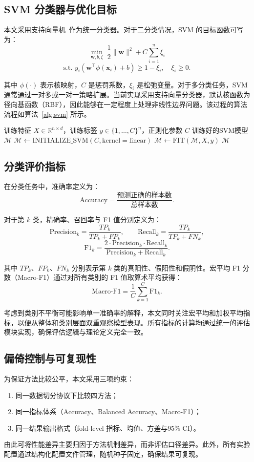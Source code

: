 \subsection{SVM 分类器与优化目标}

本文采用支持向量机~\cite{svm1995}作为统一分类器。对于二分类情况，SVM 的目标函数可写为：
\[
\min_{\mathbf{w}, b, \xi} \; \frac{1}{2}\|\mathbf{w}\|^2 + C \sum_{i=1}^{n} \xi_i
\]
\[
\text{s.t. } y_i (\mathbf{w}^\top \phi(\mathbf{x}_i) + b) \ge 1 - \xi_i, \quad \xi_i \ge 0.
\]

其中 $\phi(\cdot)$ 表示核映射，$C$ 是惩罚系数，$\xi_i$ 是松弛变量。对于多分类任务，SVM 通常通过一对多或一对一策略扩展。当前实现采用支持向量分类器，默认核函数为径向基函数（RBF），因此能够在一定程度上处理非线性边界问题。该过程的算法流程如算法~\ref{alg:svm} 所示。

\begin{algorithm}[H]
\caption{SVM分类器训练算法}
\label{alg:svm}
\begin{algorithmic}[1]
\Require 训练特征 $X \in \mathbb{R}^{n \times d}$，训练标签 $y \in \{1,\dots,C\}^n$，正则化参数 $C$
\Ensure 训练好的SVM模型 $\mathcal{M}$
\State $\mathcal{M} \gets \text{INITIALIZE\_SVM}(C, \text{kernel}=\text{linear})$
\State $\mathcal{M} \gets \text{FIT}(\mathcal{M}, X, y)$
\State \Return $\mathcal{M}$
\end{algorithmic}
\end{algorithm}

\subsection{分类评价指标}

在分类任务中，准确率定义为：
\[
\mathrm{Accuracy} = \frac{\text{预测正确的样本数}}{\text{总样本数}}.
\]

对于第 $k$ 类，精确率、召回率与 F1 值分别定义为：
\[
\mathrm{Precision}_k = \frac{TP_k}{TP_k + FP_k}, \qquad
\mathrm{Recall}_k = \frac{TP_k}{TP_k + FN_k},
\]
\[
\mathrm{F1}_k = \frac{2 \cdot \mathrm{Precision}_k \cdot \mathrm{Recall}_k}{\mathrm{Precision}_k + \mathrm{Recall}_k}.
\]

其中 $TP_k$、$FP_k$、$FN_k$ 分别表示第 $k$ 类的真阳性、假阳性和假阴性。宏平均 F1 分数（Macro-F1）通过对所有类别的 F1 值取算术平均获得：
\[
\mathrm{Macro\text{-}F1} = \frac{1}{C} \sum_{k=1}^{C} \mathrm{F1}_k.
\]

考虑到类别不平衡可能影响单一准确率的解释，本文同时关注宏平均和加权平均指标，以便从整体和类别层面双重观察模型表现。所有指标的计算均通过统一的评估模块实现，确保评估逻辑与理论定义完全一致。

\subsection{偏倚控制与可复现性}

为保证方法比较公平，本文采用三项约束：

\begin{enumerate}
    \item 同一数据切分协议下比较四方法；
    \item 同一指标体系（Accuracy、Balanced Accuracy、Macro-F1）；
    \item 同一结果输出格式（fold-level 指标、均值、方差与95\% CI）。
\end{enumerate}

由此可将性能差异主要归因于方法机制差异，而非评估口径差异。此外，所有实验配置通过结构化配置文件管理，随机种子固定，确保结果可复现。
